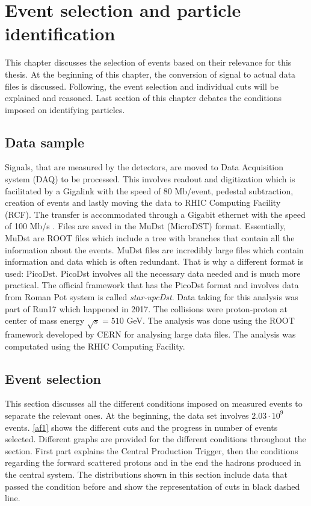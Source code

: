 \chapter{Event selection and particle identification}
\label{analysis}
This chapter discusses the selection of events based on their relevance for this thesis. At the beginning of this chapter, the conversion of signal to actual data files is discussed. Following, the event selection and individual cuts will be explained and reasoned. Last section of this chapter debates the conditions imposed on identifying particles. 
\section{Data sample}
\label{data}
Signals, that are measured by the detectors, are moved to Data Acquisition system (DAQ) to be processed. This involves readout and digitization which is facilitated by a Gigalink with the speed of 80 Mb/event, pedestal subtraction, creation of events and lastly moving the data to RHIC Computing Facility (RCF). The transfer is accommodated through a Gigabit ethernet with the speed of 100 Mb/s \cite{DAQ}. Files are saved in the MuDst (MicroDST) format. Essentially, MuDst are ROOT files\cite{ROOT} which include a tree with branches that contain all the information about the events. MuDst files are incredibly large files which contain information and data which is often redundant. That is why a different format is used: PicoDst. PicoDst involves all the necessary data needed and is much more practical. The official framework that has the PicoDst format and involves data from Roman Pot system is called \textit{star-upcDst}.  
\newline
Data taking for this analysis was part of Run17 which happened in 2017. The collisions were proton-proton at center of mass energy $\sqrt{s}=510$ GeV. The analysis was done using the ROOT framework developed by CERN for analysing large data files. The analysis was computated using the RHIC Computing Facility.


\section{Event selection}
This section discusses all the different conditions imposed on measured events to separate the relevant ones. At the beginning, the data set involves $2.03\cdot10^9$ events. \autoref{af1} shows the different cuts and the progress in number of events selected. Different graphs are provided for the different conditions throughout the section. First part explains the Central Production Trigger, then the conditions regarding the forward scattered protons and in the end the hadrons produced in the central system. The distributions shown in this section include data that passed the condition before and show the representation of cuts in black dashed line.

